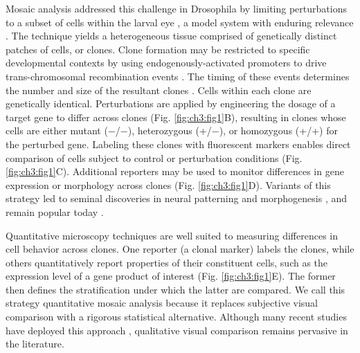 Mosaic analysis addressed this challenge in Drosophila by limiting perturbations to a subset of cells within the larval eye \cite{Xu1993,Xu2012}, a model system with enduring relevance \cite{Beira2016}. The technique yields a heterogeneous tissue comprised of genetically distinct patches of cells, or clones. Clone formation may be restricted to specific developmental contexts by using endogenously-activated promoters to drive trans-chromosomal recombination events \cite{Newsome2000,Theodosiou1998}. The timing of these events determines the number and size of the resultant clones \cite{Struhl1993}. Cells within each clone are genetically identical. Perturbations are applied by engineering the dosage of a target gene to differ across clones (Fig. \ref{fig:ch3:fig1}B), resulting in clones whose cells are either mutant (−/−), heterozygous (+/−), or homozygous (+/+) for the perturbed gene. Labeling these clones with fluorescent markers enables direct comparison of cells subject to control or perturbation conditions (Fig. \ref{fig:ch3:fig1}C). Additional reporters may be used to monitor differences in gene expression or morphology across clones (Fig. \ref{fig:ch3:fig1}D). Variants of this strategy led to seminal discoveries in neural patterning \cite{Halfar2001,Tomlinson2001,Yang2001} and morphogenesis \cite{Huang2005,Thompson2006}, and remain popular today \cite{Atkins2019,Enomoto2018,Germani2018}.

Quantitative microscopy techniques are well suited to measuring differences in cell behavior across clones. One reporter (a clonal marker) labels the clones, while others quantitatively report properties of their constituent cells, such as the expression level of a gene product of interest (Fig. \ref{fig:ch3:fig1}E). The former then defines the stratification under which the latter are compared. We call this strategy quantitative mosaic analysis because it replaces subjective visual comparison with a rigorous statistical alternative. Although many recent studies have deployed this approach \cite{Bernasek2018,Burrous2017,Ghiglione2018,Li2018}, qualitative visual comparison remains pervasive in the literature.

